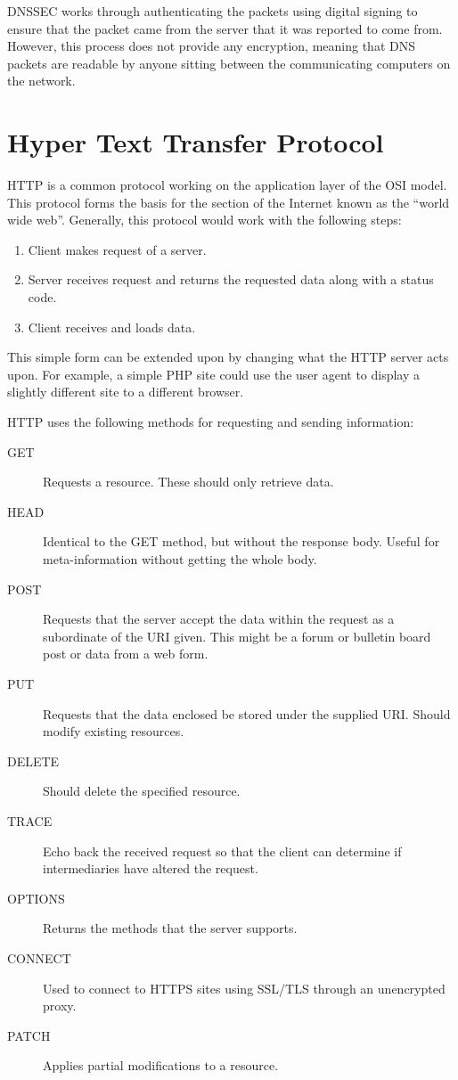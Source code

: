 			DNSSEC works through authenticating the packets using digital signing to ensure that the packet came from the server that it was reported to come from.
			However, this process does not provide any encryption, meaning that DNS packets are readable by anyone sitting between the communicating computers on the network.

	\section{Hyper Text Transfer Protocol}
		HTTP is a common protocol working on the application layer of the OSI model.
		This protocol forms the basis for the section of the Internet known as the ``world wide web''.
		Generally, this protocol would work with the following steps:
		\begin{enumerate}
			\item Client makes request of a server.
			\item Server receives request and returns the requested data along with a status code.
			\item Client receives and loads data.
		\end{enumerate}

		This simple form can be extended upon by changing what the HTTP server acts upon.
		For example, a simple PHP site could use the user agent to display a slightly different site to a different browser.

		HTTP uses the following methods for requesting and sending information:
		\begin{description}
			\item[GET] Requests a resource. These should only retrieve data.
			\item[HEAD] Identical to the GET method, but without the response body.
				Useful for meta-information without getting the whole body.
			\item[POST] Requests that the server accept the data within the request as a subordinate of the URI given.
				This might be a forum or bulletin board post or data from a web form.
			\item[PUT] Requests that the data enclosed be stored under the supplied URI. Should modify existing resources.
			\item[DELETE] Should delete the specified resource.
			\item[TRACE] Echo back the received request so that the client can determine if intermediaries have altered the request.
			\item[OPTIONS] Returns the methods that the server supports.
			\item[CONNECT] Used to connect to HTTPS sites using SSL/TLS through an unencrypted proxy.
			\item[PATCH] Applies partial modifications to a resource.
		\end{description}

